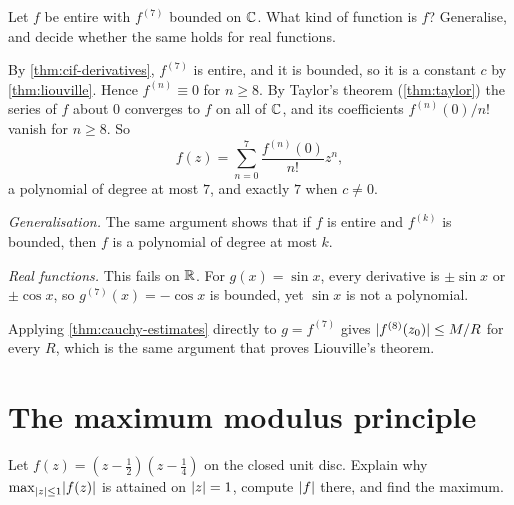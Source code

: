 \begin{exercise}\label{ex:bounded-seventh-derivative}
  Let $f$ be entire with $f^{(7)}$ bounded on $\mathbb{C}$. What kind of function is
  $f$? Generalise, and decide whether the same holds for real functions.
\end{exercise}

\begin{solution}
  By \cref{thm:cif-derivatives}, $f^{(7)}$ is entire, and it is bounded, so it
  is a constant $c$ by \cref{thm:liouville}. Hence $f^{(n)} \equiv 0$ for
  $n \geq 8$. By Taylor's theorem (\cref{thm:taylor}) the series of $f$ about
  $0$ converges to $f$ on all of $\mathbb{C}$, and its coefficients
  $f^{(n)}(0) / n!$ vanish for $n \geq 8$. So
  \[
    f(z) = \sum_{n=0}^{7} \frac{f^{(n)}(0)}{n!} z^n,
  \]
  a polynomial of degree at most $7$, and exactly $7$ when $c \neq 0$.

  \emph{Generalisation.} The same argument shows that if $f$ is entire and
  $f^{(k)}$ is bounded, then $f$ is a polynomial of degree at most $k$.

  \emph{Real functions.} This fails on $\mathbb{R}$. For $g(x) = \sin x$, every
  derivative is $\pm \sin x$ or $\pm \cos x$, so $g^{(7)}(x) = -\cos x$ is
  bounded, yet $\sin x$ is not a polynomial.
\end{solution}

\begin{remark}
  Applying \cref{thm:cauchy-estimates} directly to $g = f^{(7)}$ gives
  $\lvert f^{(8)}(z_0)\rvert \leq M / R$ for every $R$, which is the same argument
  that proves Liouville's theorem.
\end{remark}

\section{The maximum modulus principle}\label{sec:maximum-modulus}



\begin{exercise}\label{ex:max-on-disc}
  Let $f(z) = \left(z - \frac12\right)\left(z - \frac14\right)$ on the closed
  unit disc. Explain why $\max_{\lvert z\rvert \leq 1} \lvert f(z)\rvert$ is attained on
  $\lvert z\rvert = 1$, compute $\lvert f\rvert$ there, and find the maximum.
\end{exercise}

